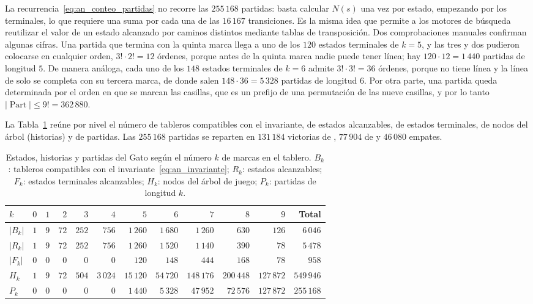 La recurrencia~\eqref{eq:an_conteo_partidas} no recorre las $255\,168$ partidas: basta calcular $N(s)$ una vez por estado, empezando por los terminales, lo que requiere una suma por cada una de las $16\,167$ transiciones. Es la misma idea que permite a los motores de búsqueda reutilizar el valor de un estado alcanzado por caminos distintos mediante tablas de transposición. Dos comprobaciones manuales confirman algunas cifras. Una partida que termina con la quinta marca llega a uno de los $120$ estados terminales de $k = 5$, y las tres  y dos  pudieron colocarse en cualquier orden, $3! \cdot 2! = 12$ órdenes, porque antes de la quinta marca nadie puede tener línea; hay $120 \cdot 12 = 1\,440$ partidas de longitud $5$. De manera análoga, cada uno de los $148$ estados terminales de $k = 6$ admite $3! \cdot 3! = 36$ órdenes, porque  no tiene línea y la línea de  solo se completa con su tercera marca, de donde salen $148 \cdot 36 = 5\,328$ partidas de longitud $6$. Por otra parte, una partida queda determinada por el orden en que se marcan las casillas, que es un prefijo de una permutación de las nueve casillas, y por lo tanto $|\operatorname{Part}| \le 9! = 362\,880$.

La Tabla~\ref{tab:an_gato_niveles} reúne por nivel el número de tableros compatibles con el invariante, de estados alcanzables, de estados terminales, de nodos del árbol (historias) y de partidas. Las $255\,168$ partidas se reparten en $131\,184$ victorias de , $77\,904$ de  y $46\,080$ empates.

\begin{table}[htbp]
\centering
\footnotesize
\caption{Estados, historias y partidas del Gato según el número $k$ de marcas en el tablero. $B_k$: tableros compatibles con el invariante~\eqref{eq:an_invariante}; $R_k$: estados alcanzables; $F_k$: estados terminales alcanzables; $H_k$: nodos del árbol de juego; $P_k$: partidas de longitud $k$.}
\label{tab:an_gato_niveles}
\setlength{\tabcolsep}{4pt}
\begin{tabular}{@{}l rrrrrrrrrr r@{}}
\toprule
$k$ & $0$ & $1$ & $2$ & $3$ & $4$ & $5$ & $6$ & $7$ & $8$ & $9$ & Total \\
\midrule
$|B_k|$ & $1$ & $9$ & $72$ & $252$ & $756$ & $1\,260$ & $1\,680$ & $1\,260$ & $630$ & $126$ & $6\,046$ \\
$|R_k|$ & $1$ & $9$ & $72$ & $252$ & $756$ & $1\,260$ & $1\,520$ & $1\,140$ & $390$ & $78$ & $5\,478$ \\
$|F_k|$ & $0$ & $0$ & $0$ & $0$ & $0$ & $120$ & $148$ & $444$ & $168$ & $78$ & $958$ \\
$H_k$ & $1$ & $9$ & $72$ & $504$ & $3\,024$ & $15\,120$ & $54\,720$ & $148\,176$ & $200\,448$ & $127\,872$ & $549\,946$ \\
$P_k$ & $0$ & $0$ & $0$ & $0$ & $0$ & $1\,440$ & $5\,328$ & $47\,952$ & $72\,576$ & $127\,872$ & $255\,168$ \\
\bottomrule
\end{tabular}
\end{table}

